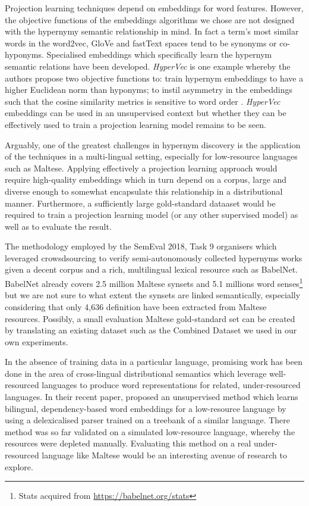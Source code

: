 Projection learning techniques depend on embeddings for word features.  However, the objective functions of the embeddings algorithms we chose are not designed with the hypernymy semantic relationship in mind.  In fact a term's most similar words in the word2vec, GloVe and fastText spaces tend to be synonyms or co-hyponyms.  Specialised embeddings which specifically learn the hypernym semantic relations have been developed.  \textit{HyperVec} is one example whereby the authors propose two objective functions to: train hypernym embeddings to have a higher Euclidean norm than hyponyms; to instil asymmetry in the embeddings such that the cosine similarity metrics is sensitive to word order \citep{nguyen2017hierarchical}.  \textit{HyperVec} embeddings can be used in an unsupervised context but whether they can be effectively used to train a projection learning model remains to be seen.

Arguably, one of the greatest challenges in hypernym discovery is the application of the techniques in a multi-lingual setting, especially for low-resource languages such as Maltese.  Applying effectively a projection learning approach would require high-quality embeddings which in turn depend on a corpus, large and diverse enough to somewhat encapsulate this relationship in a distributional manner.  Furthermore, a sufficiently large gold-standard dataaset would be required to train a projection learning model (or any other supervised model) as well as to evaluate the result.

The methodology employed by the SemEval 2018, Task 9 organisers which leveraged crowsdsourcing to verify semi-autonomously collected hypernyms works given a decent corpus and a rich, multilingual lexical resource such as BabelNet.  BabelNet already covers 2.5 million Maltese synsets and 5.1 millions word senses\footnote{Stats acquired from \url{https://babelnet.org/stats}} but we are not sure to what extent the synsets are linked semantically, especially considering that only 4,636 definition have been extracted from Maltese resources.  Possibly, a small evaluation Maltese gold-standard set can be created by translating an existing dataset such as the Combined Dataset we used in our own experiments.

In the absence of training data in a particular language, promising work has been done in the area of cross-lingual distributional semantics which leverage well-resourced languages to produce word representations for related, under-resourced languages.  In their recent paper, \citet{upadhyay2018robust} proposed an unsupervised method which learns bilingual, dependency-based word embeddings for a low-resource language by using a delexicalised parser trained on a treebank of a similar language.  There method was so far validated on a simulated low-resource language, whereby the resources were depleted manually.  Evaluating this method on a real under-resourced language like Maltese would be an interesting avenue of research to explore. 